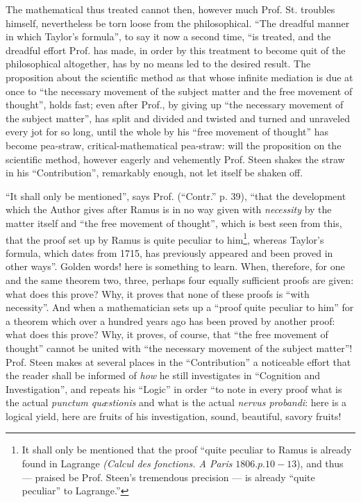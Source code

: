 \documentclass[12pt,a4paper,openany]{book}
\newcommand{\opage}[1]{\marginnote{\footnotesize\textit{[#1]}}}
\begin{document}
\opage{16}\setcounter{footnote}{0}%
The mathematical thus treated cannot then, however much Prof. St. troubles himself, nevertheless be torn loose from the philosophical. ``The dreadful manner in which
Taylor's formula'', to say it now a second time, ``is treated, and the dreadful effort Prof. has made,
in order by this treatment to become quit of the philosophical altogether,
has by no means led to the desired result. The proposition about the scientific method as that whose infinite mediation is due at once to ``the necessary movement of the subject matter and the free movement of thought'', holds fast; even after
Prof., by giving up ``the necessary movement of the subject matter'',
has split and divided and twisted and turned and unraveled every
jot for so long, until the whole by his ``free movement of thought'' has become pea-straw, critical-mathematical pea-straw: will the proposition on the scientific method, however
eagerly and vehemently Prof. Steen shakes the straw in his
``Contribution'', remarkably enough, not let itself be shaken off.

``It shall only be mentioned'', says Prof. (``Contr.'' p.
39), ``that the development which the Author gives after Ramus is in
no way given with \emph{necessity} by the matter
itself and ``the free movement of thought'', which is best seen from this,
that the proof set up by Ramus is quite peculiar to him\footnote{It shall only be mentioned that the proof ``quite peculiar to Ramus
is already found in Lagrange \textit{(Calcul des fonctions. A Paris}
$1806. p. 10-13$), and thus --- praised be Prof. Steen's
tremendous precision --- is already ``quite peculiar'' to Lagrange.''}, whereas Taylor's formula, which dates from 1715,
has previously appeared and been proved in other ways''. Golden
words! here is something to learn. When, therefore, for one and the
same theorem two, three, perhaps four equally sufficient proofs are given: what does this prove? Why, it proves that
none of these proofs is ``with necessity''. And when
a mathematician sets up a ``proof quite peculiar to him''
for a theorem which over a hundred years ago
\opage{17}\setcounter{footnote}{0}%
has been proved by another proof: what does
this prove? Why, it proves, of course, that ``the free movement of thought'' cannot
be united with ``the necessary movement of the subject matter''! Prof.
Steen makes at several places in the ``Contribution'' a noticeable effort that the reader shall be informed of \emph{how}
he still investigates in ``Cognition and Investigation'', and repeats his ``Logic'' in order ``to note in every proof
what is the actual \textit{punctum quæstionis} and what
is the actual \textit{nervus probandi}: here is a logical yield,
here are fruits of his investigation, sound, beautiful, savory fruits!
\end{document}
